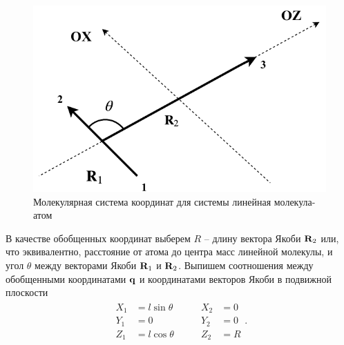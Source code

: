 \begin{figure}[H]
    \centering
    \includegraphics[width=0.5\linewidth]{pictures/triatom_coordinates.pdf}
    \caption{Молекулярная система координат для системы линейная молекула-атом}
    \label{fig:body-fixed-linear-atom}
\end{figure}

В качестве обобщенных координат выберем $R$ -- длину вектора Якоби $\mathbf{R}_2$ или, что эквивалентно, расстояние от атома до центра масс линейной молекулы, и угол $\theta$ между векторами Якоби $\mathbf{R}_1$ и $\mathbf{R}_2$. Выпишем соотношения между обобщенными координатами $\mathbf{q}$ и координатами векторов Якоби в подвижной плоскости
\begin{gather}
    \begin{aligned}
        X_1 &= l \sin \theta \\
        Y_1 &= 0 \\
        Z_1 &= l \cos \theta
    \end{aligned} \qquad
    \begin{aligned}
        X_2 &= 0 \\ 
        Y_2 &= 0 \\
        Z_2 &= R 
    \end{aligned}. \label{linear-molecule-atom-jacobi-coords}
\end{gather}

